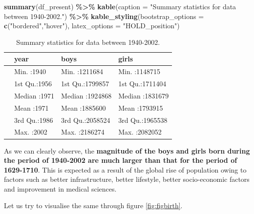 \documentclass[11pt,a4paper,]{article}
\newenvironment{Shaded}{\begin{snugshade}}{\end{snugshade}}
\newcommand{\AttributeTok}[1]{\textcolor[rgb]{0.13,0.29,0.53}{#1}}
\newcommand{\FunctionTok}[1]{\textcolor[rgb]{0.13,0.29,0.53}{\textbf{#1}}}
\newcommand{\NormalTok}[1]{#1}
\newcommand{\SpecialCharTok}[1]{\textcolor[rgb]{0.81,0.36,0.00}{\textbf{#1}}}
\newcommand{\StringTok}[1]{\textcolor[rgb]{0.31,0.60,0.02}{#1}}
\begin{document}
\begin{Shaded}
\begin{Highlighting}[]
\FunctionTok{summary}\NormalTok{(df\_present) }\SpecialCharTok{\%\textgreater{}\%} \FunctionTok{kable}\NormalTok{(}\AttributeTok{caption =} \StringTok{"Summary statistics for data between 1940{-}2002."}\NormalTok{) }\SpecialCharTok{\%\textgreater{}\%} 
  \FunctionTok{kable\_styling}\NormalTok{(}\AttributeTok{bootstrap\_options =} \FunctionTok{c}\NormalTok{(}\StringTok{"bordered"}\NormalTok{,}\StringTok{"hover"}\NormalTok{),}
                                    \AttributeTok{latex\_options =} \StringTok{"HOLD\_position"}\NormalTok{) }
\end{Highlighting}
\end{Shaded}

\begin{table}[H]

\caption{\label{tab:sumstatpre}Summary statistics for data between 1940-2002.}
\centering
\begin{tabular}[t]{l|l|l|l}
\hline
  &      year &      boys &     girls\\
\hline
 & Min.   :1940 & Min.   :1211684 & Min.   :1148715\\
\hline
 & 1st Qu.:1956 & 1st Qu.:1799857 & 1st Qu.:1711404\\
\hline
 & Median :1971 & Median :1924868 & Median :1831679\\
\hline
 & Mean   :1971 & Mean   :1885600 & Mean   :1793915\\
\hline
 & 3rd Qu.:1986 & 3rd Qu.:2058524 & 3rd Qu.:1965538\\
\hline
 & Max.   :2002 & Max.   :2186274 & Max.   :2082052\\
\hline
\end{tabular}
\end{table}

\normalsize

As we can clearly observe, the \textbf{magnitude of the boys and girls born during the period of 1940-2002 are much larger than that for the period of 1629-1710}. This is expected as a result of the global rise of population owing to factors such as better infrastructure, better lifestyle, better socio-economic factors and improvement in medical sciences.

Let us try to visualise the same through figure \ref{fig:figbirth}.

\tiny
\end{document}
